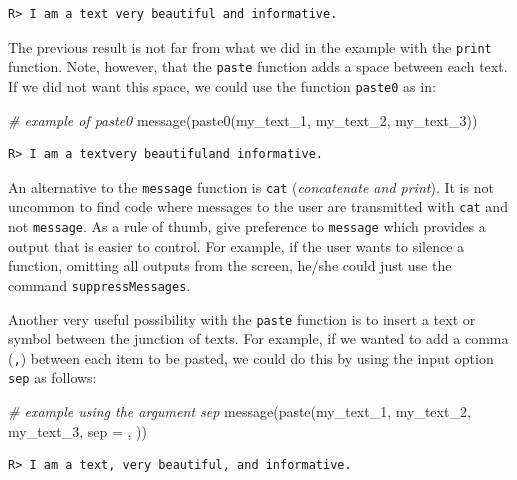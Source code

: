\documentclass[
  12pt,
]{book}
\newenvironment{Shaded}{\begin{snugshade}}{\end{snugshade}}
\newcommand{\AttributeTok}[1]{\textcolor[rgb]{0.61,0.61,0.61}{#1}}
\newcommand{\CommentTok}[1]{\textcolor[rgb]{0.37,0.37,0.37}{\textit{#1}}}
\newcommand{\FunctionTok}[1]{\textcolor[rgb]{0,0,0}{#1}}
\newcommand{\NormalTok}[1]{#1}
\newcommand{\StringTok}[1]{\textcolor[rgb]{0.5,0.5,0.5}{#1}}
\newenvironment{rmdimportant}
{\begin{importantblock}
		
	} {\end{importantblock}}
\begin{document}
\begin{verbatim}
R> I am a text very beautiful and informative.
\end{verbatim}

The previous result is not far from what we did in the example with the \texttt{print} function. Note, however, that the \texttt{paste} function adds a space between each text. If we did not want this space, we could use the function \texttt{paste0} as in:

\begin{Shaded}
\begin{Highlighting}[]
\CommentTok{\# example of paste0}
\FunctionTok{message}\NormalTok{(}\FunctionTok{paste0}\NormalTok{(my\_text\_1, my\_text\_2, my\_text\_3))}
\end{Highlighting}
\end{Shaded}

\begin{verbatim}
R> I am a textvery beautifuland informative.
\end{verbatim}

\begin{rmdimportant}
An alternative to the \texttt{message} function is \texttt{cat}
(\emph{concatenate and print}). It is not uncommon to find code where
messages to the user are transmitted with \texttt{cat} and not
\texttt{message}. As a rule of thumb, give preference to
\texttt{message} which provides a output that is easier to control. For
example, if the user wants to silence a function, omitting all outputs
from the screen, he/she could just use the command
\texttt{suppressMessages}.
\end{rmdimportant}

Another very useful possibility with the \texttt{paste} function is to insert a text or symbol between the junction of texts. For example, if we wanted to add a comma (\texttt{,}) between each item to be pasted, we could do this by using the input option \texttt{sep} as follows:

\begin{Shaded}
\begin{Highlighting}[]
\CommentTok{\# example using the argument sep}
\FunctionTok{message}\NormalTok{(}\FunctionTok{paste}\NormalTok{(my\_text\_1, my\_text\_2, my\_text\_3, }\AttributeTok{sep =} \StringTok{\textquotesingle{}, \textquotesingle{}}\NormalTok{))}
\end{Highlighting}
\end{Shaded}

\begin{verbatim}
R> I am a text, very beautiful, and informative.
\end{verbatim}
\end{document}
